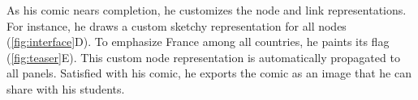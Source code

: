 


As his comic nears completion, he customizes the node and link representations. For instance, he  draws a custom sketchy representation for all nodes (\autoref{fig:interface}D). To emphasize France among all countries, he paints its flag (\autoref{fig:teaser}E).
 This custom node representation is automatically propagated to all panels.  %
 Satisfied with his comic, he exports the comic as an image that he can share with his students.







